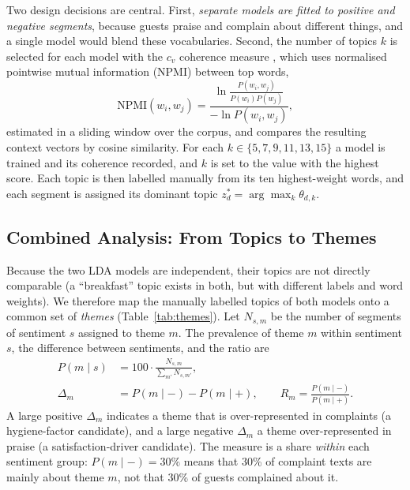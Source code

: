 \documentclass[11pt,journal,draftclsnofoot,onecolumn]{IEEEtran}
\begin{document}
Two design decisions are central. First, \emph{separate models are fitted to positive and negative segments}, because guests praise and complain about different things, and a single model would blend these vocabularies. Second, the number of topics $k$ is selected for each model with the $c_v$ coherence measure \cite{roder2015}, which uses normalised pointwise mutual information (NPMI) between top words,
\begin{equation}
\mathrm{NPMI}(w_i,w_j)=\frac{\ln\frac{P(w_i,w_j)}{P(w_i)P(w_j)}}{-\ln P(w_i,w_j)},
\end{equation}
estimated in a sliding window over the corpus, and compares the resulting context vectors by cosine similarity. For each $k\in\{5,7,9,11,13,15\}$ a model is trained and its coherence recorded, and $k$ is set to the value with the highest score. Each topic is then labelled manually from its ten highest-weight words, and each segment is assigned its dominant topic $z_d^{*}=\arg\max_k\theta_{d,k}$.

\subsection{Combined Analysis: From Topics to Themes}
Because the two LDA models are independent, their topics are not directly comparable (a ``breakfast'' topic exists in both, but with different labels and word weights). We therefore map the manually labelled topics of both models onto a common set of \emph{themes} (Table~\ref{tab:themes}). Let $N_{s,m}$ be the number of segments of sentiment $s$ assigned to theme $m$. The prevalence of theme $m$ within sentiment $s$, the difference between sentiments, and the ratio are
\begin{align}
P(m\mid s)&=100\cdot\frac{N_{s,m}}{\sum_{m'}N_{s,m'}},\\
\Delta_m&=P(m\mid -)-P(m\mid +),\qquad R_m=\frac{P(m\mid -)}{P(m\mid +)} .
\end{align}
A large positive $\Delta_m$ indicates a theme that is over-represented in complaints (a hygiene-factor candidate), and a large negative $\Delta_m$ a theme over-represented in praise (a satisfaction-driver candidate). The measure is a share \emph{within} each sentiment group: $P(m\mid -)=30\%$ means that 30\% of complaint texts are mainly about theme $m$, not that 30\% of guests complained about it.
\end{document}
